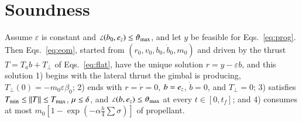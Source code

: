 \section{Soundness}\label{sec:proof}
\begin{theorem}\label{thm:sound}
Assume $\varepsilon$ is constant and $\angle(b_0,e_z)\le\vartheta_{\max}$, and let $y$ be feasible for Eqs.~\eqref{eq:prog}. Then
Eqs.~\eqref{eq:eom}, started from $(r_0,v_0,b_0,\dot b_0,m_0)$ and driven by the thrust $T=T_ab+T_\perp$ of
Eqs.~\eqref{eq:flat}, have the unique solution $r=y-\varepsilon b$, and this solution 1) begins with the lateral thrust the
gimbal is producing, $T_\perp(0)=-m_0\varepsilon\beta_0$; 2) ends with $r=\dot r=0$, $b=e_z$, $\dot b=0$, and $T_\perp=0$;
3) satisfies $T_{\min}\le\lVert T\rVert\le T_{\max}$, $\mu\le\delta$, and $\angle(b,e_z)\le\vartheta_{\max}$ at every $t\in[0,t_f]$; and
4) consumes at most $m_0[1-\exp(-\alpha\tfrac h4\sum\sigma)]$ of propellant.
\end{theorem}
